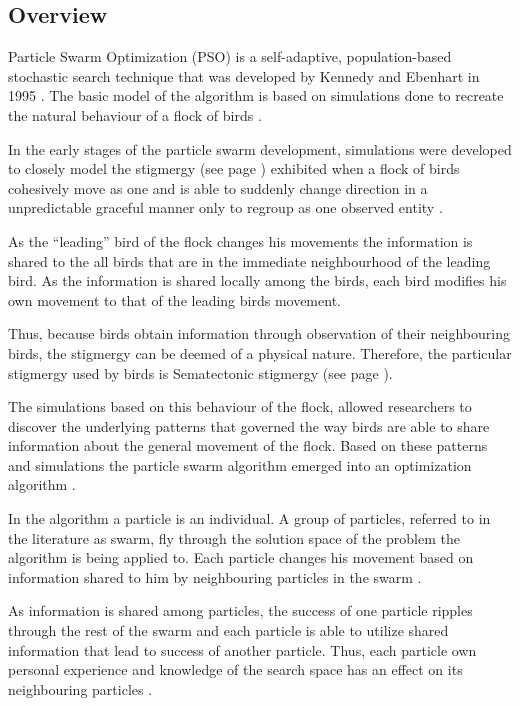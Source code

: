 \subsection{Overview}
Particle Swarm Optimization (PSO) is a self-adaptive, population-based stochastic search technique that was developed by Kennedy and Ebenhart in 1995 \cite{PSOGABreeding,PSOGABreeding}. The basic model of the algorithm is based on simulations done to recreate the natural behaviour of a flock of birds \cite{PSOSoftTesting}.

In the early stages of the particle swarm development, simulations were developed to closely model the stigmergy (see page \pageref{def:stigmergy}) exhibited when a flock of birds cohesively move as one and is able to suddenly change direction in a unpredictable graceful manner only to regroup as one observed entity \cite{PSOHybridJobShop}. 

As the ``leading'' bird of the flock changes his movements the information is shared to the all birds that are in the immediate neighbourhood of the leading bird. As the information is shared locally among the birds, each bird modifies his own movement to that of the leading birds movement\cite{PSOHybridJobShop}. 

Thus, because birds obtain information through observation of their neighbouring birds, the stigmergy can be deemed of a physical nature. Therefore, the particular stigmergy used by birds is Sematectonic stigmergy (see page \pageref{def:sematectonic}).

The simulations based on this behaviour of the flock, allowed researchers to discover the underlying patterns that governed the way birds are able to share information about the general movement of the flock. Based on these patterns and simulations the particle swarm algorithm emerged into an optimization algorithm \cite{CompuIntelligenceIntro}.

In the algorithm a particle is an individual. A group of particles, referred to in the literature as swarm, fly through the solution space of the problem the algorithm is being applied to. Each particle changes his movement based on information shared to him by neighbouring particles in the swarm \cite{FundamentalSwarm,CompuIntelligenceIntro}. 

As information is shared among particles, the success of one particle ripples through the rest of the swarm and each particle is able to utilize shared information that lead to success of another particle. Thus, each particle own personal experience and knowledge of the search space has an effect on its neighbouring particles \cite{FundamentalSwarm,CompuIntelligenceIntro}.


